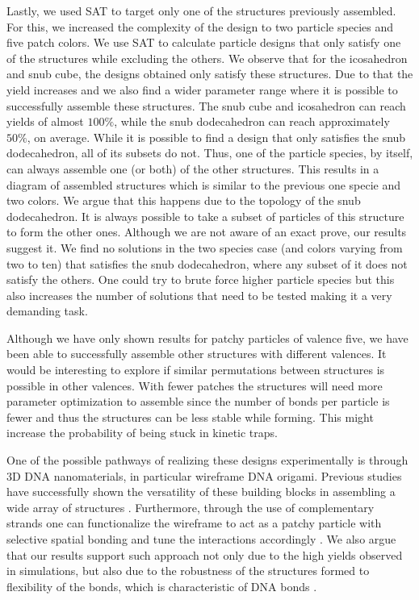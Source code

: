 \documentclass[a4paper, amsfonts, amssymb, amsmath, reprint, showkeys, nofootinbib, twoside]{revtex4-1}
\begin{document}
Lastly, we used SAT to target only one of the structures previously assembled. For this, we increased the complexity of the design to two particle species and five patch colors. We use SAT to calculate particle designs that only satisfy one of the structures while excluding the others. We observe that for the icosahedron and snub cube, the designs obtained only satisfy these structures. Due to that the yield increases and we also find a wider parameter range where it is possible to successfully assemble these structures. The snub cube and icosahedron can reach yields of almost $100\%$, while the snub dodecahedron can reach approximately $50\%$, on average. While it is possible to find a design that only satisfies the snub dodecahedron, all of its subsets do not. Thus, one of the particle species, by itself, can always assemble one (or both) of the other structures. This results in a diagram of assembled structures which is similar to the previous one specie and two colors. We argue that this happens due to the topology of the snub dodecahedron. It is always possible to take a subset of particles of this structure to form the other ones. Although we are not aware of an exact prove, our results suggest it. We find no solutions in the two species case (and colors varying from two to ten) that satisfies the snub dodecahedron, where any subset of it does not satisfy the others. One could try to brute force higher particle species but this also increases the number of solutions that need to be tested making it a very demanding task.

Although we have only shown results for patchy particles of valence five, we have been able to successfully assemble other structures with different valences. It would be interesting to explore if similar permutations between structures is possible in other valences. With fewer patches the structures will need more parameter optimization to assemble since the number of bonds per particle is fewer and thus the structures can be less stable while forming. This might increase the probability of being stuck in kinetic traps.

One of the possible pathways of realizing these designs experimentally is through 3D DNA nanomaterials, in particular wireframe DNA origami. Previous studies have successfully shown the versatility of these building blocks in assembling a wide array of structures \cite{Mosayebi2017, Lee2022, Jun2021, Rothemund2006}. Furthermore, through the use of complementary strands one can functionalize the wireframe to act as a patchy particle with selective spatial bonding and tune the interactions accordingly \cite{Biancaniello2005, Wang2015}. We also argue that our results support such approach not only due to the high yields observed in simulations, but also due to the robustness of the structures formed to flexibility of the bonds, which is characteristic of DNA bonds \cite{Meulen2015, Meulen2015, Geerts2010}.
\end{document}

